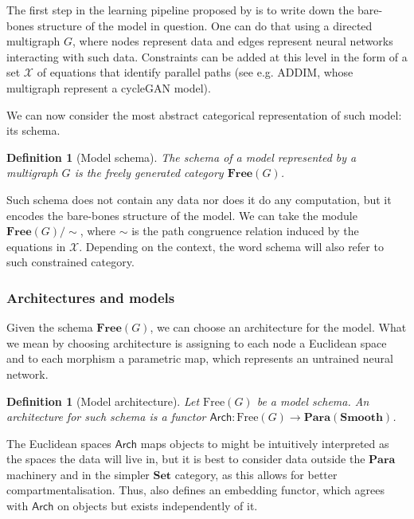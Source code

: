 \documentclass[12pt,a4paper,openright,twoside]{report}
\theoremstyle{plain}
\newtheorem{definition}[proposition]{Definition}
\theoremstyle{definition}
\begin{document}
The first step in the learning pipeline proposed by \cite{gavranovic2019compositional} is to write down the bare-bones structure of the model in question. One can do that using a directed multigraph $G$, where nodes represent data and edges represent neural networks interacting with such data. Constraints can be added at this level in the form of a set $\mathcal{X}$ of equations that identify parallel paths (see e.g. ADDIM, whose multigraph represent a cycleGAN model).


We can now consider the most abstract categorical representation of such model: its schema. 

\begin{definition}[Model schema]
  The schema of a model represented by a multigraph $G$ is the freely generated category $\mathbf{Free}(G)$.
\end{definition}

Such schema does not contain any data nor does it do any computation, but it encodes the bare-bones structure of the model. We can take the module $\mathbf{Free}(G)/{\sim}$, where ${\sim}$ is the path congruence relation induced by the equations in $\mathcal{X}$. Depending on the context, the word schema will also refer to such constrained category.

\subsubsection{Architectures and models}


Given the schema $\mathbf{Free}(G)$, we can choose an architecture for the model. What we mean by choosing architecture is assigning to each node a Euclidean space and to each morphism a parametric map, which represents an untrained neural network.

\begin{definition}[Model architecture]
  Let $\mathrm{Free}(G)$ be a model schema. An architecture for such schema is a functor $\mathsf{Arch}: \mathrm{Free}(G) \to \mathbf{Para}(\mathbf{Smooth})$.
\end{definition}

The Euclidean spaces $\mathsf{Arch}$ maps objects to might be intuitively interpreted as the spaces the data will live in, but it is best to consider data outside the $\mathbf{Para}$ machinery and in the simpler $\mathbf{Set}$ category, as this allows for better compartmentalisation. Thus, \cite{gavranovic2019compositional} also defines an embedding functor, which agrees with $\mathsf{Arch}$ on objects but exists independently of it.
\end{document}
